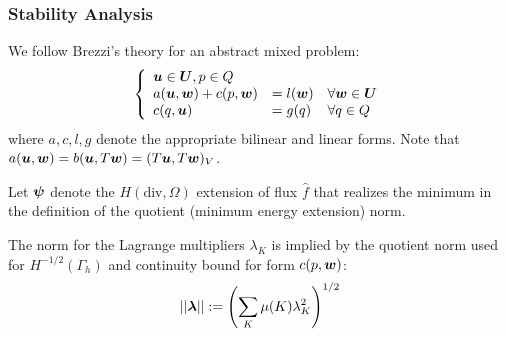 \documentclass{beamer}
\begin{document}
\begin{frame}
\frametitle{Stability Analysis}
We follow Brezzi's theory for an abstract mixed problem:
\begin{equation*}
\left\{
\begin{array}{lll}
\boldsymbol u \in \boldsymbol U, p \in Q\\
a(\boldsymbol u,\boldsymbol w) + c(p,\boldsymbol w) & = l(\boldsymbol w) & \forall \boldsymbol w \in \boldsymbol U \\
c(q,\boldsymbol u) & = g(q) & \forall q \in Q
\end{array}
\right.
\end{equation*}
where $a,c,l,g$ denote the appropriate
bilinear and linear forms. Note that $a(\boldsymbol u,\boldsymbol w)=b(\boldsymbol u,T\boldsymbol w)=(T\boldsymbol u,T\boldsymbol w)_V$.

Let $\boldsymbol\psi$ denote the $H(\text{div},\Omega)$ extension of flux $\hat{f}$
that realizes the minimum in the definition of the quotient (minimum energy
extension) norm.

The norm for the Lagrange multipliers $\lambda_K$ is implied
by the quotient norm used for $H^{-1/2}(\Gamma_h)$ and continuity
bound for form $c(p,\boldsymbol w)$:
\[
||\boldsymbol\lambda||:=\left(\sum_K \mu(K) \lambda_K^2\right)^{1/2}
\]
\end{frame}

\end{document}
